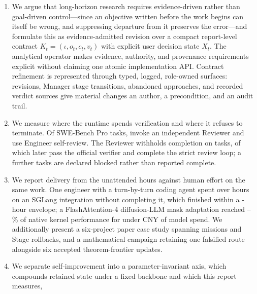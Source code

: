 \begin{enumerate}[label=\textbf{C\arabic*.}]
    research judgment; duty cycle of \DutyCycleLow--\DutyCycleHigh\% with work in
    hand. We further show the residual gap is dominated by infrastructure failure
    rather than agent hesitation.
  \item We argue that long-horizon research requires evidence-driven rather than
    goal-driven control---since an objective written before the work begins can
    itself be wrong, and suppressing departure from it preserves the error---and
    formulate this as evidence-admitted revision over a compact report-level contract
    $K_t=(\iota,o_t,c_t,v_t)$ with explicit user decision state $X_t$. The analytical  operator makes evidence, authority, and
    provenance requirements explicit without claiming one atomic implementation API.
    Contract refinement is represented through typed, logged, role-owned surfaces:
     revisions, Manager stage transitions, abandoned approaches,
    and recorded verdict sources give material changes an author, a precondition, and
    an audit trail.
  \item We measure where the runtime spends verification and where it refuses to
    terminate. Of \ReviewerTasks{} SWE-Bench Pro tasks, \ReviewerInvoked{} invoke an
    independent Reviewer and \ReviewerSkipped{} use Engineer self-review. The Reviewer
    withholds completion on \ReviewerRevisionRequested{} tasks, of which
    \ReviewerVerifierRecovered{} later pass the official verifier and
    \ReviewerStrictRescues{} complete the strict review loop; a further
    \ReviewerFirstBlocked{} tasks are declared blocked rather than reported complete.
  \item We report delivery from the unattended hours against human effort on the same
    work. One engineer with a turn-by-turn coding agent spent over
    \SGLangHumanHours{} hours on an SGLang integration without completing it, which
    \systemname finished within a \SGLangArgusHours{}-hour envelope; a
    FlashAttention-4 diffusion-LLM mask adaptation reached
    \FlashDAGapLow--\FlashDAGapHigh\% of native kernel performance for under
    \FlashDACostCNY{} CNY of model spend. We additionally present a six-project paper
    case study spanning \PaperCaseMissions{} missions and \PaperCaseRollbacks{} Stage
    rollbacks, and a mathematical campaign retaining one falsified route alongside six
    accepted theorem-frontier updates.
  \item We separate self-improvement into a parameter-invariant axis, which
    compounds retained state under a fixed backbone and which this report measures,

\end{enumerate}
